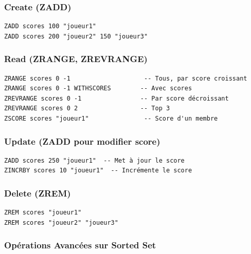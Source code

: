 \documentclass[11pt,a4paper]{article}
\begin{document}
\subsubsection{Create (ZADD)}

\begin{lstlisting}
ZADD scores 100 "joueur1"
ZADD scores 200 "joueur2" 150 "joueur3"
\end{lstlisting}

\subsubsection{Read (ZRANGE, ZREVRANGE)}

\begin{lstlisting}
ZRANGE scores 0 -1                    -- Tous, par score croissant
ZRANGE scores 0 -1 WITHSCORES        -- Avec scores
ZREVRANGE scores 0 -1                -- Par score décroissant
ZREVRANGE scores 0 2                 -- Top 3
ZSCORE scores "joueur1"               -- Score d'un membre
\end{lstlisting}

\subsubsection{Update (ZADD pour modifier score)}

\begin{lstlisting}
ZADD scores 250 "joueur1"  -- Met à jour le score
ZINCRBY scores 10 "joueur1"  -- Incrémente le score
\end{lstlisting}

\subsubsection{Delete (ZREM)}

\begin{lstlisting}
ZREM scores "joueur1"
ZREM scores "joueur2" "joueur3"
\end{lstlisting}

\subsubsection{Opérations Avancées sur Sorted Set}
\end{document}
